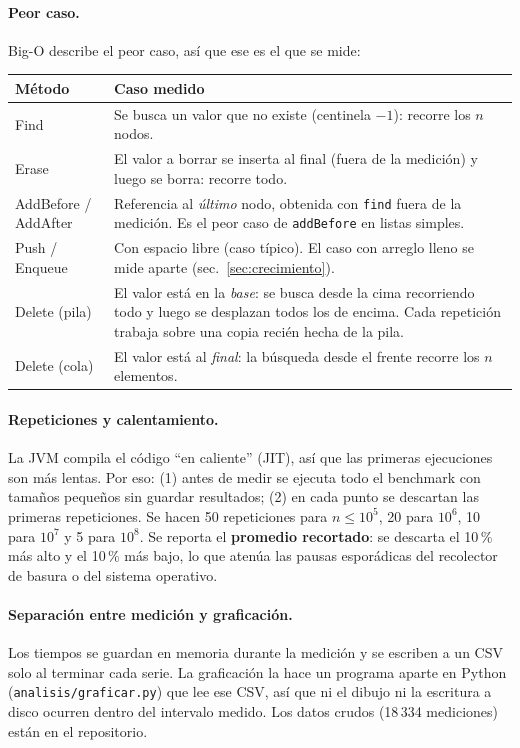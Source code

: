 \documentclass[11pt,a4paper]{article}
\begin{document}
\paragraph{Peor caso.} Big-O describe el peor caso, así que ese es el que se mide:
\begin{table}[H]\centering\small
\begin{tabular}{l p{12cm}}
\toprule
\textbf{Método} & \textbf{Caso medido} \\
\midrule
Find & Se busca un valor que no existe (centinela $-1$): recorre los $n$ nodos. \\
Erase & El valor a borrar se inserta al final (fuera de la medición) y luego se borra: recorre todo. \\
AddBefore / AddAfter & Referencia al \emph{último} nodo, obtenida con \texttt{find} fuera de la medición. Es el peor caso de \texttt{addBefore} en listas simples. \\
Push / Enqueue & Con espacio libre (caso típico). El caso con arreglo lleno se mide aparte (sec.~\ref{sec:crecimiento}). \\
Delete (pila) & El valor está en la \emph{base}: se busca desde la cima recorriendo todo y luego se desplazan todos los de encima. Cada repetición trabaja sobre una copia recién hecha de la pila. \\
Delete (cola) & El valor está al \emph{final}: la búsqueda desde el frente recorre los $n$ elementos. \\
\bottomrule
\end{tabular}
\end{table}

\paragraph{Repeticiones y calentamiento.} La JVM compila el código ``en caliente'' (JIT), así que las
primeras ejecuciones son más lentas. Por eso: (1) antes de medir se ejecuta todo el benchmark con
tamaños pequeños sin guardar resultados; (2) en cada punto se descartan las primeras repeticiones.
Se hacen 50 repeticiones para $n \le 10^5$, 20 para $10^6$, 10 para $10^7$ y 5 para $10^8$. Se reporta
el \textbf{promedio recortado}: se descarta el 10\,\% más alto y el 10\,\% más bajo, lo que atenúa las
pausas esporádicas del recolector de basura o del sistema operativo.

\paragraph{Separación entre medición y graficación.} Los tiempos se guardan en memoria durante la
medición y se escriben a un CSV solo al terminar cada serie. La graficación la hace un programa aparte
en Python (\texttt{analisis/graficar.py}) que lee ese CSV, así que ni el dibujo ni la escritura a disco
ocurren dentro del intervalo medido. Los datos crudos (18\,334 mediciones) están en el repositorio.
\end{document}
